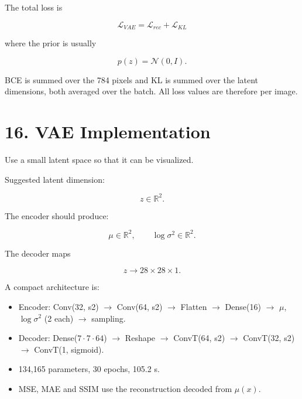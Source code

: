 \documentclass[10pt]{article}
\begin{document}
The total loss is

\[
\boxed{
\mathcal{L}_{VAE}
=
\mathcal{L}_{rec}
+
\mathcal{L}_{KL}
}
\]

where the prior is usually

\[
p(z)=\mathcal{N}(0,I).
\]

BCE is summed over the 784 pixels and KL is summed over the latent dimensions, both averaged over the batch. All loss values are therefore per image.

\section*{16. VAE Implementation}

Use a small latent space so that it can be visualized.

Suggested latent dimension:

\[
z\in\mathbb{R}^{2}.
\]

The encoder should produce:

\[
\mu\in\mathbb{R}^{2},
\qquad
\log\sigma^2\in\mathbb{R}^{2}.
\]

The decoder maps

\[
z\rightarrow28\times28\times1.
\]

A compact architecture is:

\begin{center}
\end{center}

\begin{itemize}
\item Encoder: Conv(32, s2) $\rightarrow$ Conv(64, s2) $\rightarrow$ Flatten $\rightarrow$ Dense(16) $\rightarrow$ $\mu$, $\log\sigma^2$ (2 each) $\rightarrow$ sampling.
\item Decoder: Dense($7\cdot7\cdot64$) $\rightarrow$ Reshape $\rightarrow$ ConvT(64, s2) $\rightarrow$ ConvT(32, s2) $\rightarrow$ ConvT(1, sigmoid).
\item 134,165 parameters, 30 epochs, 105.2 s.
\item MSE, MAE and SSIM use the reconstruction decoded from $\mu(x)$.
\end{itemize}
\end{document}
